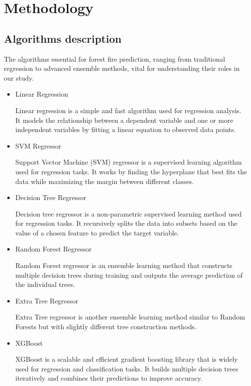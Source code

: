 \chapter{Methodology}
\label{ch:method}

\section{Algorithms description}
The algorithms essential for forest fire prediction, ranging from traditional regression to advanced ensemble methods, vital for understanding their roles in our study.
\begin{itemize}

\item Linear Regression

Linear regression is a simple and fast algorithm used for regression analysis. It models the relationship between a dependent variable and one or more independent variables by fitting a linear
equation to observed data points.

\item SVM Regressor

Support Vector Machine (SVM) regressor is a supervised learning algorithm used for regression tasks. It works by finding the hyperplane that best fits the data while maximizing the margin
between different classes.

\item Decision Tree Regressor

Decision tree regressor is a non-parametric supervised learning method used for regression tasks. It recursively splits the data into subsets based on the value of a chosen feature to predict the target variable.

\item Random Forest Regressor

Random Forest regressor is an ensemble learning method that constructs multiple decision trees during training and outputs the average prediction of the individual trees.

\item Extra Tree Regressor

Extra Tree regressor is another ensemble learning method similar to Random Forests but with slightly different tree construction methods.

\item XGBoost

XGBoost is a scalable and efficient gradient boosting library that is widely used for regression and classification tasks. It builds multiple decision trees iteratively and combines their predictions to improve accuracy.


\end{itemize}
